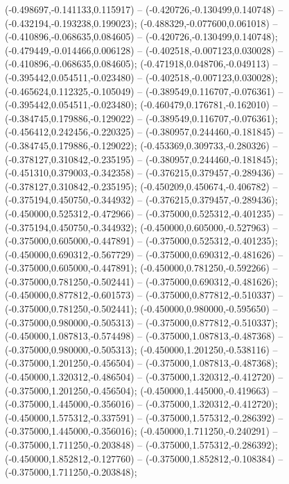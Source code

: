  (-0.498697,-0.141133,0.115917) -- (-0.420726,-0.130499,0.140748) -- (-0.432194,-0.193238,0.199023);
 (-0.488329,-0.077600,0.061018) -- (-0.410896,-0.068635,0.084605) -- (-0.420726,-0.130499,0.140748);
 (-0.479449,-0.014466,0.006128) -- (-0.402518,-0.007123,0.030028) -- (-0.410896,-0.068635,0.084605);
 (-0.471918,0.048706,-0.049113) -- (-0.395442,0.054511,-0.023480) -- (-0.402518,-0.007123,0.030028);
 (-0.465624,0.112325,-0.105049) -- (-0.389549,0.116707,-0.076361) -- (-0.395442,0.054511,-0.023480);
 (-0.460479,0.176781,-0.162010) -- (-0.384745,0.179886,-0.129022) -- (-0.389549,0.116707,-0.076361);
 (-0.456412,0.242456,-0.220325) -- (-0.380957,0.244460,-0.181845) -- (-0.384745,0.179886,-0.129022);
 (-0.453369,0.309733,-0.280326) -- (-0.378127,0.310842,-0.235195) -- (-0.380957,0.244460,-0.181845);
 (-0.451310,0.379003,-0.342358) -- (-0.376215,0.379457,-0.289436) -- (-0.378127,0.310842,-0.235195);
 (-0.450209,0.450674,-0.406782) -- (-0.375194,0.450750,-0.344932) -- (-0.376215,0.379457,-0.289436);
 (-0.450000,0.525312,-0.472966) -- (-0.375000,0.525312,-0.401235) -- (-0.375194,0.450750,-0.344932);
 (-0.450000,0.605000,-0.527963) -- (-0.375000,0.605000,-0.447891) -- (-0.375000,0.525312,-0.401235);
 (-0.450000,0.690312,-0.567729) -- (-0.375000,0.690312,-0.481626) -- (-0.375000,0.605000,-0.447891);
 (-0.450000,0.781250,-0.592266) -- (-0.375000,0.781250,-0.502441) -- (-0.375000,0.690312,-0.481626);
 (-0.450000,0.877812,-0.601573) -- (-0.375000,0.877812,-0.510337) -- (-0.375000,0.781250,-0.502441);
 (-0.450000,0.980000,-0.595650) -- (-0.375000,0.980000,-0.505313) -- (-0.375000,0.877812,-0.510337);
 (-0.450000,1.087813,-0.574498) -- (-0.375000,1.087813,-0.487368) -- (-0.375000,0.980000,-0.505313);
 (-0.450000,1.201250,-0.538116) -- (-0.375000,1.201250,-0.456504) -- (-0.375000,1.087813,-0.487368);
 (-0.450000,1.320312,-0.486504) -- (-0.375000,1.320312,-0.412720) -- (-0.375000,1.201250,-0.456504);
 (-0.450000,1.445000,-0.419663) -- (-0.375000,1.445000,-0.356016) -- (-0.375000,1.320312,-0.412720);
 (-0.450000,1.575312,-0.337591) -- (-0.375000,1.575312,-0.286392) -- (-0.375000,1.445000,-0.356016);
 (-0.450000,1.711250,-0.240291) -- (-0.375000,1.711250,-0.203848) -- (-0.375000,1.575312,-0.286392);
 (-0.450000,1.852812,-0.127760) -- (-0.375000,1.852812,-0.108384) -- (-0.375000,1.711250,-0.203848);

